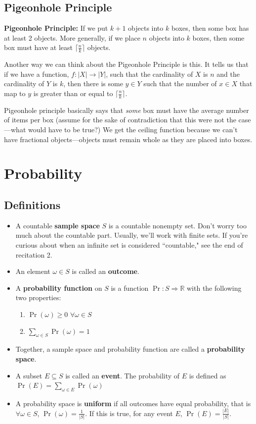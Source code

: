 \documentclass[12pt,letterpaper]{article}
\begin{document}
\subsection{Pigeonhole Principle}
\textbf{Pigeonhole Principle:} If we put $k+1$ objects into $k$ boxes, then some box has at least 2 objects. More generally, if we place $n$ objects into $k$ boxes, then some box must have at least $\lceil \frac{n}{k} \rceil$ objects. 

Another way we can think about the Pigeonhole Principle is this. It tells us that if we have a function, $f : |X| \to |Y|$, such that the cardinality of $X$ is $n$ and the cardinality of $Y$ is $k$, then there is some $y \in Y$ such that the number of $x \in X$ that map to $y$ is greater than or equal to $\lceil {\frac{n}{k}} \rceil$. 

Pigeonhole principle basically says that \textit{some} box must have the average number of items per box (assume for the sake of contradiction that this were not the  case---what would have to be true?) We get the ceiling function because we can't have fractional objects---objects must remain whole as they are placed into boxes.

\section{Probability}

\subsection{Definitions}

\begin{itemize}
    \item A countable \textbf{sample space} $S$ is a countable nonempty set. Don't worry too much about the countable part. Usually, we'll work with finite sets. If you're curious about when an infinite set is considered ``countable," see the end of recitation 2.
    \item An element $\omega \in S$ is called an \textbf{outcome}.
    \item A \textbf{probability function} on $S$ is a function $\Pr : S \Rightarrow \mathbb{R}$ with the following two properties:
        \begin{enumerate}
            \item $\Pr(\omega) \geq 0$ $\forall \omega \in S$
            \item $\sum_{\omega \in S} \Pr(\omega) = 1$
        \end{enumerate}
    \item Together, a sample space and probability function are called a \textbf{probability space}. 
    \item A subset $E \subseteq S$ is called an \textbf{event}. The probability of $E$ is defined as $\Pr(E) = \sum_{\omega \in E} \Pr(\omega)$
    \item A probability space is \textbf{uniform} if all outcomes have equal probability, that is $\forall \omega \in S$, $\Pr(\omega) = \frac{1}{|S|}$. If this is true, for any event $E$, $\Pr(E)=\frac{|E|}{|S|}$.
\end{itemize}
\end{document}
